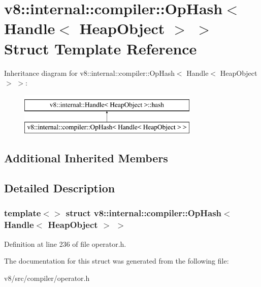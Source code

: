 \hypertarget{structv8_1_1internal_1_1compiler_1_1OpHash_3_01Handle_3_01HeapObject_01_4_01_4}{}\section{v8\+:\+:internal\+:\+:compiler\+:\+:Op\+Hash$<$ Handle$<$ Heap\+Object $>$ $>$ Struct Template Reference}
\label{structv8_1_1internal_1_1compiler_1_1OpHash_3_01Handle_3_01HeapObject_01_4_01_4}
Inheritance diagram for v8\+:\+:internal\+:\+:compiler\+:\+:Op\+Hash$<$ Handle$<$ Heap\+Object $>$ $>$\+:\begin{figure}[H]
\begin{center}
\leavevmode
\includegraphics[height=2.000000cm]{structv8_1_1internal_1_1compiler_1_1OpHash_3_01Handle_3_01HeapObject_01_4_01_4}
\end{center}
\end{figure}
\subsection*{Additional Inherited Members}


\subsection{Detailed Description}
\subsubsection*{template$<$$>$\newline
struct v8\+::internal\+::compiler\+::\+Op\+Hash$<$ Handle$<$ Heap\+Object $>$ $>$}



Definition at line 236 of file operator.\+h.



The documentation for this struct was generated from the following file\+:\begin{DoxyCompactItemize}
\item 
v8/src/compiler/operator.\+h\end{DoxyCompactItemize}
